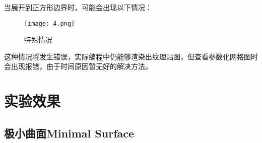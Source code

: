 \documentclass[14pt]{scrartcl} %
\begin{document}
当展开到正方形边界时，可能会出现以下情况：
\begin{figure}[h] %
	\centering
	\texttt{[image: 4.png]} %
	\caption{特殊情况 }
\end{figure}

这种情况将发生错误，实际编程中仍能够渲染出纹理贴图，但查看参数化网格图时会出现报错，由于时间原因暂无好的解决方法。

\pagebreak

\section{实验效果}

\subsection{极小曲面Minimal Surface}
\end{document}
